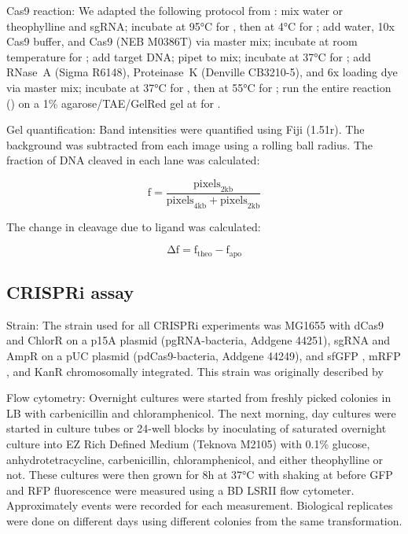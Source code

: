 \documentclass[10pt,oneside]{article}
\begin{document}
Cas9 reaction: We adapted the following protocol from : 
mix  water or  theophylline and   sgRNA; 
incubate at 95°C for , then at 4°C for ; add  water, 
 10x Cas9 buffer, and   Cas9 (NEB M0386T) via master 
mix; incubate at room temperature for ; add   target 
DNA; pipet to mix; incubate at 37°C for ; add   RNase~A 
(Sigma R6148),   Proteinase~K (Denville CB3210-5), and 
 6x loading dye via master mix; incubate at 37°C for , then 
at 55°C for ; run the entire reaction () on a 1\% 
agarose/TAE/GelRed gel at  for .

Gel quantification: Band intensities were quantified using Fiji (1.51r).  The 
background was subtracted from each image using a  rolling ball radius.  
The fraction of DNA cleaved in each lane was calculated:

\begin{displaymath}
 \mathrm{f} = \frac{\mathrm{pixels}_\mathrm{2kb}}{\mathrm{pixels}_\mathrm{4kb} 
 + \mathrm{pixels}_\mathrm{2kb}}
\end{displaymath}

The change in cleavage due to ligand was calculated: 

\begin{displaymath}
 \mathrm{Δf} = \mathrm{f}_\mathrm{theo} - \mathrm{f}_\mathrm{apo}
\end{displaymath}

\subsection{CRISPRi assay}

Strain: The strain used for all CRISPRi experiments was \ecoli{} MG1655 with 
dCas9 and ChlorR on a p15A plasmid (pgRNA-bacteria, Addgene 44251), sgRNA and 
AmpR on a pUC plasmid (pdCas9-bacteria, Addgene 44249), and sfGFP 
\autocite{pedelacq2006}, mRFP \autocite{campbell2002}, and KanR chromosomally 
integrated.  This strain was originally described by 

Flow cytometry: Overnight cultures were started from freshly picked colonies in 
 LB with  carbenicillin and  chloramphenicol.  The 
next morning, day cultures were started in  culture tubes or 24-well 
blocks by inoculating  of saturated overnight culture into  EZ Rich 
Defined Medium (Teknova M2105) with 0.1\% glucose,  
an\-hydro\-tetra\-cycline,  carbenicillin,  chloramphenicol, 
and either  theophylline or not.  These cultures were then grown for 8h 
at 37°C with shaking at  before GFP and RFP fluorescence were measured 
using a BD LSRII flow cytometer.  Approximately \unit[10,000]{events} were 
recorded for each measurement.  Biological replicates were done on different 
days using different colonies from the same transformation.
\end{document}
